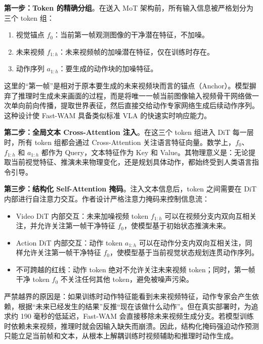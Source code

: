 \textbf{第一步：Token 的精确分组}。在送入 MoT 架构前，所有输入信息被严格划分为三个 token 组：

\begin{enumerate}
\def\labelenumi{\arabic{enumi}.}
\tightlist
\item
  视觉锚点 \(f_0\)：当前第一帧观测图像的干净潜在特征，不加噪。
\item
  未来视频 \(f_{1:h}\)：未来视频帧的加噪潜在特征，仅在训练时存在。
\item
  动作序列 \(a_{1:h}\)：要生成的动作块的加噪特征。
\end{enumerate}

这里的``第一帧''是相对于原本要生成的未来视频块而言的锚点（Anchor）。模型摒弃了推理时生成未来画面的过程，而是将唯一一帧当前图像输入视频骨干网络做一次单向前向传播，提取世界表征，然后直接交给动作专家网络生成后续动作序列。这种设计使 Fast-WAM 具备类似标准 VLA 的快速实时响应能力。

\textbf{第二步：全局文本 Cross-Attention 注入}。在这三个 token 组进入 DiT 每一层时，所有 token 组都会通过 Cross-Attention 关注语言特征向量。数学上，\(f_0\)、\(f_{1:h}\) 和 \(a_{1:h}\) 都作为 Query，文本特征作为 Key 和 Value。其物理意义是：无论提取当前视觉特征、推演未来物理变化，还是规划具体动作，都始终受到人类语言指令引导。

\textbf{第三步：结构化 Self-Attention 掩码}。注入文本信息后，token 之间需要在 DiT 内部进行自注意力交互。作者设计严格注意力掩码来控制信息流：

\begin{itemize}
\tightlist
\item
  Video DiT 内部交互：未来加噪视频 token \(f_{1:h}\) 可以在视频分支内双向互相关注，并允许关注第一帧干净特征 \(f_0\)，使模型基于初始状态推演未来。
\item
  Action DiT 内部交互：动作 token \(a_{1:h}\) 可以在动作分支内双向互相关注，同样允许关注第一帧干净特征 \(f_0\)，使模型基于当前视觉状态规划连贯动作序列。
\item
  不可跨越的红线：动作 token 绝对不允许关注未来视频 token；同时，第一帧干净 token \(f_0\) 不关注任何其他 token，避免被噪声污染。
\end{itemize}

严禁越界的原因是：如果训练时动作特征能看到未来视频特征，动作专家会产生依赖，根据``未来已经发生的结果''反推``现在该做什么动作''。但在真实部署时，为追求约 190 毫秒的低延迟，Fast-WAM 会直接移除未来视频生成分支。若模型训练时依赖未来视频，推理时就会因输入缺失而崩溃。因此，结构化掩码强迫动作预测只能立足当前帧和文本，从根本上解耦训练时视频辅助和推理时动作生成。

